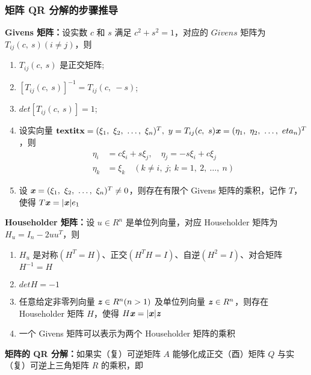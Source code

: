         \subsubsection{矩阵 QR 分解的步骤推导}
            \par \textbf{Givens 矩阵：}设实数 $c$ 和 $s$ 满足 $c^2 + s^2 = 1$，对应的 $Givens$ 矩阵为 $T_{ij}(c, \ s)(i \ne j)$，则
            \begin{enumerate}
                \item $T_{ij}(c, \ s)$ 是正交矩阵;
                \item $[T_{ij}(c, \ s)]^{-1} = T_{ij}(c, \ -s)$;
                \item $det[T_{ij}(c, \ s)] = 1$;
                \item 设实向量 $\textbf{textit{x}} = (\xi_1, \ \xi_2, \ \dots, \ \xi_n)^T, \ y = T_{ij}(c, \ s)\textbf{\textit{x}} = (\eta_1, \ \eta_2, \ \dots, \ eta_n)^T$，则
                    \begin{align*}
                        \eta_i &= c\xi_i + s\xi_j, \quad \eta_j = -s\xi_i + c\xi_j \\
                        \eta_k &= \xi_k \quad (k \ne i, \ j; \ k = 1, \ 2, \ \dots, \ n)
                    \end{align*}
                \item 设 $\textbf{\textit{x}} = (\xi_1, \ \xi_2, \ \dots, \ \xi_n)^T \ne 0$，则存在有限个 Givens 矩阵的乘积，记作 $T$，使得 $T\textbf{\textit{x}} = |\textbf{\textit{x}}|e_1$
            \end{enumerate}
            \par \textbf{Householder 矩阵：}设 $u \in R^n$ 是单位列向量，对应 Householder 矩阵为 $H_u = I_n - 2uu^T$，则
            \begin{enumerate}
                \item $H_u$ 是对称$(H^T=H)$、正交$(H^TH=I)$、自逆$(H^2=I)$、对合矩阵$H^{-1}=H$
                \item $detH = -1$
                \item 任意给定非零列向量 $\textbf{\textit{z}} \in R^n(n > 1)$ 及单位列向量 $\textbf{\textit{z}} \in R^n$，则存在 Householder 矩阵 $H$，使得 $H\textbf{\textit{x}} = |\textbf{\textit{x}}|\textbf{\textit{z}}$
                \item 一个 Givens 矩阵可以表示为两个 Householder 矩阵的乘积
            \end{enumerate}
            \par \textbf{矩阵的 QR 分解：}如果实（复）可逆矩阵 $A$ 能够化成正交（酉）矩阵 $Q$ 与实（复）可逆上三角矩阵 $R$ 的乘积，即
